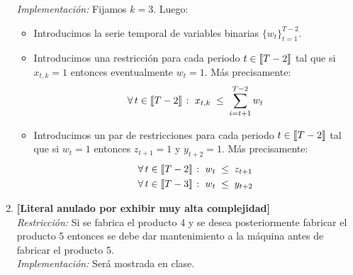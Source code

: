 \documentclass[ a4paper, twoside, 11pt]{article}
\begin{document}
\begin{problem}
\begin{enumerate}[label=\textbf{\alph*)}]
\emph{Implementaci\'on:} Fijamos $k = 3$. Luego: 
\begin{itemize}
\item Introducimos la serie temporal de variables binarias $\{ w_t \}_{t=1}^{T-2}$. 
\item Introducimos una restricci\'on para cada periodo $t \in \llbracket T-2 \rrbracket$ tal que si $x_{t,k} = 1$ entonces eventualmente $w_t = 1$. M\'as precisamente: 
\[
\forall \, t \in \llbracket T-2 \rrbracket \; \colon \;
x_{t,k} \; \leq \; \sum_{i=t+1}^{T-2} w_t
\]
\item Introducimos un par de restricciones para cada periodo $t \in \llbracket T-2 \rrbracket$ tal que si $w_t = 1$ entonces $z_{t+1} = 1$ y $y_{t+2} = 1$. M\'as precisamente: 
\begin{align*}
& \forall \, t \in \llbracket T-2 \rrbracket \; \colon \;
w_t \; \leq \; z_{t+1} \\
& \forall \, t \in \llbracket T-3 \rrbracket \; \colon \;
w_t \; \leq \; y_{t+2}
\end{align*}
\end{itemize}
\item \textbf{[Literal anulado por exhibir muy alta complejidad]} \\[1ex]
\emph{Restricci\'on:} Si se fabrica el producto 4 y se desea posteriormente fabricar el producto 5 entonces se debe dar mantenimiento a la m\'aquina antes de fabricar el producto 5. \\[1ex]
\emph{Implementaci\'on:} Ser\'a mostrada en clase. 

\end{enumerate}

\end{problem}
\vspace{\baselineskip}
\end{document}
